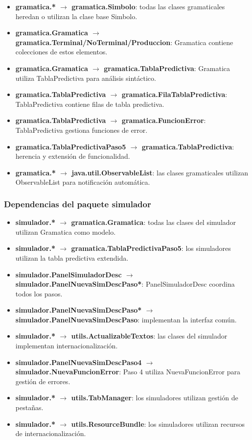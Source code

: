 \begin{itemize}
    \item \textbf{gramatica.* $\rightarrow$ gramatica.Simbolo}: todas las clases gramaticales heredan o utilizan la clase base Simbolo.
    \item \textbf{gramatica.Gramatica $\rightarrow$ gramatica.Terminal/NoTerminal/Produccion}: Gramatica contiene colecciones de estos elementos.
    \item \textbf{gramatica.Gramatica $\rightarrow$ gramatica.TablaPredictiva}: Gramatica utiliza TablaPredictiva para análisis sintáctico.
    \item \textbf{gramatica.TablaPredictiva $\rightarrow$ gramatica.FilaTablaPredictiva}: TablaPredictiva contiene filas de tabla predictiva.
    \item \textbf{gramatica.TablaPredictiva $\rightarrow$ gramatica.FuncionError}: TablaPredictiva gestiona funciones de error.
    \item \textbf{gramatica.TablaPredictivaPaso5 $\rightarrow$ gramatica.TablaPredictiva}: herencia y extensión de funcionalidad.
    \item \textbf{gramatica.* $\rightarrow$ java.util.ObservableList}: las clases gramaticales utilizan ObservableList para notificación automática.
\end{itemize}

\subsubsection{Dependencias del paquete simulador}

\begin{itemize}
    \item \textbf{simulador.* $\rightarrow$ gramatica.Gramatica}: todas las clases del simulador utilizan Gramatica como modelo.
    \item \textbf{simulador.* $\rightarrow$ gramatica.TablaPredictivaPaso5}: los simuladores utilizan la tabla predictiva extendida.
    \item \textbf{simulador.PanelSimuladorDesc $\rightarrow$ simulador.PanelNuevaSimDescPaso*}: PanelSimuladorDesc coordina todos los pasos.
    \item \textbf{simulador.PanelNuevaSimDescPaso* $\rightarrow$ simulador.PanelNuevaSimDescPaso}: implementan la interfaz común.
    \item \textbf{simulador.* $\rightarrow$ utils.ActualizableTextos}: las clases del simulador implementan internacionalización.
    \item \textbf{simulador.PanelNuevaSimDescPaso4 $\rightarrow$ simulador.NuevaFuncionError}: Paso 4 utiliza NuevaFuncionError para gestión de errores.
    \item \textbf{simulador.* $\rightarrow$ utils.TabManager}: los simuladores utilizan gestión de pestañas.
    \item \textbf{simulador.* $\rightarrow$ utils.ResourceBundle}: los simuladores utilizan recursos de internacionalización.
\end{itemize}

